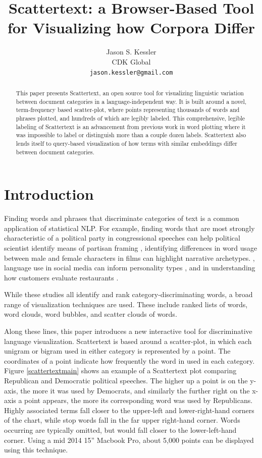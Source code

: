 \documentclass[11pt,a4paper]{article}
\title{Scattertext: a Browser-Based Tool for Visualizing how Corpora Differ}
\author{Jason S. Kessler \\
  CDK Global \\
  {\tt jason.kessler@gmail.com}  \\}
\date{}
\begin{document}
\maketitle
\begin{abstract}
This paper presents Scattertext, an open source tool for visualizing linguistic variation between document categories in a language-independent way.  It is built around a novel, term-frequency based scatter-plot, where points representing thousands of words and phrases plotted, and hundreds of which are legibly labeled.  This comprehensive, legible labeling of Scattertext is an advancement from previous work in word plotting where it was impossible to label or distinguish more than a couple dozen labels.  Scattertext also lends itself to query-based visualization of how terms with similar embeddings differ between document categories.
\end{abstract}

\section{Introduction}
Finding words and phrases that discriminate categories of text is a common application of statistical NLP. For example, finding words that are most strongly characteristic of a political party in congressional speeches can help political scientist identify means of partisan framing \cite{monroe08,grimmer2010}, identifying differences in word usage between male and female characters in films can highlight narrative archetypes. \cite{schofield2016gender}, language use in social media can inform personality types \cite{Schwartz13}, and in understanding how customers evaluate restaurants \cite{jurafsky2014}.

While these studies all identify and rank category-discriminating words, a broad range of visualization techniques are used.  These include ranked lists of words, word clouds, word bubbles, and scatter clouds of words. 

Along these lines, this paper introduces a new interactive tool for discriminative language visualization.  Scattertext is based around a scatter-plot, in which each unigram or bigram used in either category is represented by a point. The coordinates of a point indicate how frequently the word in used in each category.  Figure \ref{scattertextmain} shows an example of a Scattertext plot comparing Republican and Democratic political speeches.  The higher up a point is on the y-axis, the more it was used by Democrats, and similarly the further right on the x-axis a point appears, the more its corresponding word was used by Republicans.  Highly associated terms fall closer to the upper-left and lower-right-hand corners of the chart, while stop words fall in the far upper right-hand corner.  Words occurring are typically omitted, but would fall closer to the lower-left-hand corner.  Using a mid 2014 15'' Macbook Pro, about 5,000 points can be displayed using this technique.
\end{document}
